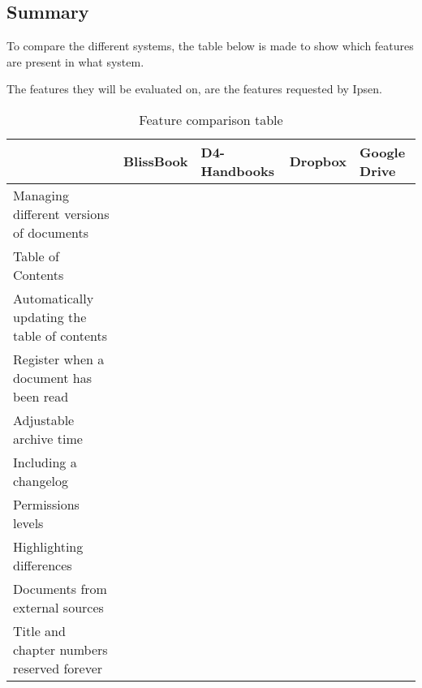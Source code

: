 \subsection{Summary}
To compare the different systems, the table below is made to show which features are present in what system.

The features they will be evaluated on, are the features requested by Ipsen.

\begin{table}[H]
	\begin{center}
		\begin{tabular}{| m{5cm}|m{1.6cm}|m{2cm}|m{1.5cm}|m{1.2cm}|}
			\hline
			& BlissBook  & D4-Handbooks & Dropbox & Google \newline Drive \\
			\hline
			Managing different versions of documents & \checkmark &  &  & \checkmark \\
			\hline
			Table of Contents & \checkmark & \checkmark  & & \\
			\hline
			Automatically updating the table of contents & \checkmark & \checkmark  &  & \\
			\hline
			Register when a document has been read & \checkmark & \checkmark &  & \\
			\hline
			Adjustable archive time &  &  &  & \\
			\hline
			Including a changelog & \checkmark & \checkmark  &  & \\
			\hline
			Permissions levels & \checkmark &  & \checkmark & \checkmark \\
			\hline
			Highlighting differences & \checkmark &  &  & \checkmark\\
			\hline
			Documents from external \newline sources &  &  & \checkmark & \checkmark \\
			\hline
			Title and chapter numbers \newline reserved forever &  &  &  & \\
			\hline
		\end{tabular}
		\caption{Feature comparison table}\label{tab:Exsisting}
	\end{center}
\end{table}

